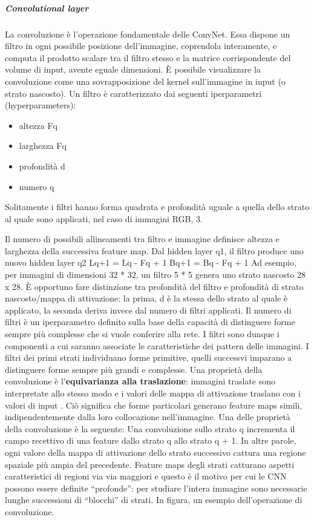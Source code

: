 \documentclass[14pt]{extarticle}
\begin{document}
\subparagraph{Convolutional layer}
La convoluzione è l’operazione fondamentale delle ConvNet. Essa dispone un filtro in ogni possibile posizione dell’immagine, coprendola interamente, e computa il prodotto scalare tra il filtro stesso e la matrice corrispondente del volume di input, avente
eguale dimensioni. È possibile visualizzare la convoluzione come una sovrapposizione del kernel sull’immagine in input (o strato nascosto). \cite{aggarwal2018neural} 
Un filtro è caratterizzato dai
seguenti iperparametri (hyperparameters):
\begin{itemize}
\item altezza Fq
\item larghezza Fq
\item profondità d
\item numero q
\end{itemize}
Solitamente i filtri hanno forma quadrata e profondità uguale a quella dello strato al
quale sono applicati, nel caso di immagini RGB, 3.  Il numero di possibili
allineamenti tra filtro e immagine definisce altezza e larghezza della successiva feature
map.
Dal hidden layer q1, il filtro produce uno nuovo hidden layer q2
Lq+1 = Lq - Fq + 1
Bq+1 = Bq - Fq + 1
Ad esempio, per immagini di dimensioni 32 * 32, un filtro 5 * 5 genera uno strato
nascosto 28 x 28.
È opportuno fare distinzione tra profondità del filtro e profondità di strato nascosto/mappa di attivazione: la prima, d è la stessa dello strato al quale è applicato, la
seconda deriva invece dal numero di filtri applicati. Il numero di filtri è un iperparametro definito sulla base della capacità di distinguere forme sempre più complesse che
si vuole conferire alla rete. I filtri sono dunque i componenti a cui saranno associate le
caratteristiche dei pattern delle immagini.
I filtri dei primi strati individuano forme primitive, quelli successvi imparano a distinguere forme sempre più grandi e complesse. Una proprietà della convoluzione è
l’\textbf{equivarianza alla traslazione}: immagini traslate sono interpretate allo stesso modo e
i valori delle mappa di attivazione traslano con i valori di input \cite{torresin2019sviluppo}. Ciò significa che forme particolari generano feature maps simili, indipendentemente dalla loro collocazione
nell’immagine.
Una delle proprietà della convoluzione è la seguente:
	 Una convoluzione sullo strato
q incrementa il campo recettivo di una feature dallo strato q allo strato q + 1. In altre parole, ogni valore della mappa di attivazione dello strato successivo cattura una regione
spaziale più ampia del precedente. Feature maps degli strati catturano aspetti caratteristici di regioni via via maggiori e questo è il motivo per cui le CNN possono essere
definite “profonde”: per studiare l’intera immagine sono necessarie lunghe successioni
di “blocchi” di strati. 
In figura, un esempio dell’operazione di convoluzione.
\end{document}
